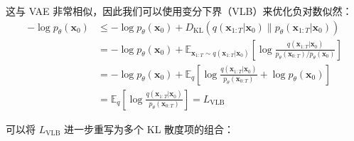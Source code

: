 \documentclass[zihao=-4, fontset=windows]{ctexart}
\begin{document}
这与 VAE 非常相似，因此我们可以使用变分下界（VLB）来优化负对数似然：
\begin{equation}
\begin{aligned}
-\log p_{\theta}(\mathbf{x}_{0}) & \leq -\log p_{\theta}(\mathbf{x}_{0}) + D_{\text{KL}}(q(\mathbf{x}_{1: T} | \mathbf{x}_{0}) \| p_{\theta}(\mathbf{x}_{1: T} | \mathbf{x}_{0})) \\
& = -\log p_{\theta}(\mathbf{x}_{0}) + \mathbb{E}_{\mathbf{x}_{1: T} \sim q(\mathbf{x}_{1: T} | \mathbf{x}_{0})}\left[\log \frac{q(\mathbf{x}_{1: T} | \mathbf{x}_{0})}{p_{\theta}(\mathbf{x}_{0: T}) / p_{\theta}(\mathbf{x}_{0})}\right] \\
& = -\log p_{\theta}(\mathbf{x}_{0}) + \mathbb{E}_{q}\left[\log \frac{q(\mathbf{x}_{1: T} | \mathbf{x}_{0})}{p_{\theta}(\mathbf{x}_{0: T})} + \log p_{\theta}(\mathbf{x}_{0})\right] \\
& = \mathbb{E}_{q}\left[\log \frac{q(\mathbf{x}_{1: T} | \mathbf{x}_{0})}{p_{\theta}(\mathbf{x}_{0: T})}\right] = L_{\text{VLB}}
\end{aligned}
\end{equation}

可以将 $L_{\text{VLB}}$ 进一步重写为多个 KL 散度项的组合：
\end{document}
